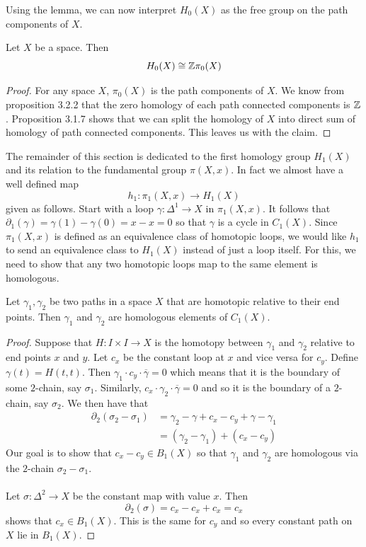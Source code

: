 \documentclass[a4paper]{article}
\begin{document}
Using the lemma, we can now interpret $H_0(X)$ as the free group on the path components of $X$. 

\begin{crl}{}{} Let $X$ be a space. Then $$H_0(X)\cong\mathbb{Z}\pi_0(X)$$ \tcbline
\begin{proof}
For any space $X$, $\pi_0(X)$ is the path components of $X$. We know from proposition 3.2.2 that the zero homology of each path connected components is $\mathbb{Z}$. Proposition 3.1.7 shows that we can split the homology of $X$ into direct sum of homology of path connected components. This leaves us with the claim. 
\end{proof}
\end{crl}

The remainder of this section is dedicated to the first homology group $H_1(X)$ and its relation to the fundamental group $\pi(X,x)$. In fact we almost have a well defined map $$h_1:\pi_1(X,x)\to H_1(X)$$ given as follows. Start with a loop $\gamma:\Delta^1\to X$ in $\pi_1(X,x)$. It follows that $\partial_1(\gamma)=\gamma(1)-\gamma(0)=x-x=0$ so that $\gamma$ is a cycle in $C_1(X)$. Since $\pi_1(X,x)$ is defined as an equivalence class of homotopic loops, we would like $h_1$ to send an equivalence class to $H_1(X)$ instead of just a loop itself. For this, we need to show that any two homotopic loops map to the same element is homologous. 

\begin{lmm}{}{} Let $\gamma_1,\gamma_2$ be two paths in a space $X$ that are homotopic relative to their end points. Then $\gamma_1$ and $\gamma_2$ are homologous elements of $C_1(X)$. \tcbline
\begin{proof}
Suppose that $H:I\times I\to X$ is the homotopy between $\gamma_1$ and $\gamma_2$ relative to end points $x$ and $y$. Let $c_x$ be the constant loop at $x$ and vice versa for $c_y$. Define $\gamma(t)=H(t,t)$. Then $\gamma_1\cdot c_y\cdot \overline{\gamma}=0$ which means that it is the boundary of some $2$-chain, say $\sigma_1$. Similarly, $c_x\cdot\gamma_2\cdot\overline{\gamma}=0$ and so it is the boundary of a $2$-chain, say $\sigma_2$. We then have that 
\begin{align*}
\partial_2(\sigma_2-\sigma_1)&=\gamma_2-\gamma+c_x-c_y+\gamma-\gamma_1\\
&=(\gamma_2-\gamma_1)+(c_x-c_y)
\end{align*}
Our goal is to show that $c_x-c_y\in B_1(X)$ so that $\gamma_1$ and $\gamma_2$ are homologous via the $2$-chain $\sigma_2-\sigma_1$. \\~\\

Let $\sigma:\Delta^2\to X$ be the constant map with value $x$. Then $$\partial_2(\sigma)=c_x-c_x+c_x=c_x$$ shows that $c_x\in B_1(X)$. This is the same for $c_y$ and so every constant path on $X$ lie in $B_1(X)$. 
\end{proof}
\end{lmm}
\end{document}
